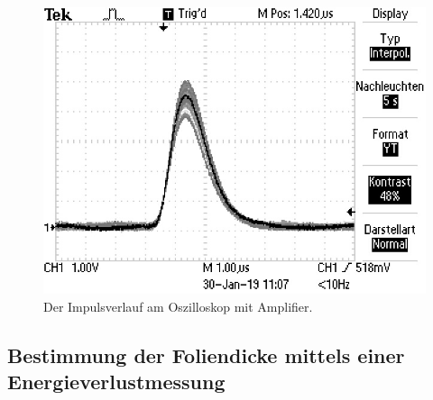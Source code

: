 \begin{figure}
	\centering
	\includegraphics[width=\linewidth-60pt,keepaspectratio]{content/images/mitVerstaerker01.jpg}
	\caption{Der Impulsverlauf am Oszilloskop mit Amplifier.}
	\label{fig:mitAmplifier}
\end{figure}

\subsection{Bestimmung der Foliendicke mittels einer Energieverlustmessung}

